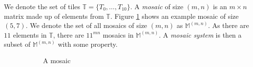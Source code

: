 \documentclass[12pt]{article}
\theoremstyle{plain}
\theoremstyle{definition}
\theoremstyle{remark}
\theoremstyle{definition}
\newcommand{\cell}[4]{ \draw[thick] ( #1 , #2 ) rectangle ( #3 , #4 );}
\newcommand{\cellA}[4]{\draw[red, thick, densely dotted] ( #1 + 0.5 , #2 ) arc(0:90:{0.5}); \draw[thick] ( #1 , #2 ) rectangle ( #3 , #4 );}
\newcommand{\cellB}[4]{\draw[red, thick, densely dotted] ( #1 + 1 , #2 + 0.5 ) arc(90:180:{0.5}); \draw[thick] ( #1 , #2 ) rectangle ( #3 , #4 );}
\newcommand{\cellC}[4]{\draw[red, thick, densely dotted] ( #1 + 0.5, #2 + 1 ) arc(180:270:{0.5}); \draw[thick] ( #1 , #2 ) rectangle ( #3 , #4 );}
\newcommand{\cellD}[4]{\draw[red, thick, densely dotted] ( #1 , #2 + 0.5 ) arc(-90:0:{0.5}); \draw[thick] ( #1 , #2 ) rectangle ( #3 , #4 );}
\newcommand{\cellE}[4]{\draw[red, thick, densely dotted] (#3, #4 * 0.5 + #2 * 0.5) -- (#1, #4 * 0.5 + #2 * 0.5); \draw[thick] ( #1 , #2 ) rectangle ( #3 , #4 );}
\newcommand{\cellF}[4]{\draw[red, thick, densely dotted] (#3 * 0.5 + #1 * 0.5 , #2) -- (#3 * 0.5 + #1 * 0.5 , #4); \draw[thick] ( #1 , #2 ) rectangle ( #3 , #4 );}
\newcommand{\cellG}[4]{\draw[red, thick, densely dotted] ( #1 + 0.5 , #2 ) arc(0:90:{0.5}); \draw[red, thick, densely dotted] ( #1 + 0.5, #2 + 1 ) arc(180:270:{0.5}); \draw[thick] ( #1 , #2 ) rectangle ( #3 , #4 );}
\newcommand{\cellH}[4]{\draw[red, thick, densely dotted] ( #1 , #2 + 0.5 ) arc(-90:0:{0.5}); \draw[red, thick, densely dotted] ( #1 + 1 , #2 + 0.5 ) arc(90:180:{0.5}); \draw[thick] ( #1 , #2 ) rectangle ( #3 , #4 );}
\newcommand{\cellI}[4]{\draw[red, thick, densely dotted] (#3 * 0.5 + #1 * 0.5 , #2) -- (#3 * 0.5 + #1 * 0.5 , #4); \node[shape=circle,draw=none,fill=white, inner sep=3pt,minimum size=5pt] (A) at ( #1 + 0.5 , #2 + 0.5 ) {}; \draw[red, thick, densely dotted] (#3, #4 * 0.5 + #2 * 0.5) -- (#1, #4 * 0.5 + #2 * 0.5); \draw[thick] ( #1 , #2 ) rectangle ( #3 , #4 );}
\newcommand{\cellJ}[4]{\draw[red, thick, densely dotted] (#3, #4 * 0.5 + #2 * 0.5) -- (#1, #4 * 0.5 + #2 * 0.5); \node[shape=circle,draw=none,fill=white, inner sep=3pt,minimum size=5pt] (A) at ( #1 + 0.5 , #2 + 0.5 ) {}; \draw[thick] ( #1 , #2 ) rectangle ( #3 , #4 ); \draw[red, thick, densely dotted] (#3 * 0.5 + #1 * 0.5 , #2) -- (#3 * 0.5 + #1 * 0.5 , #4);}
\newcommand{\cellAf}[4]{\filldraw[gray!40] ( #1 , #2 ) rectangle ( #3 , #4 ); \draw[red, thick, densely dotted] ( #1 + 0.5 , #2 ) arc(0:90:{0.5}); \draw[thick] ( #1 , #2 ) rectangle ( #3 , #4 );}
\newcommand{\cellBf}[4]{\filldraw[gray!40] ( #1 , #2 ) rectangle ( #3 , #4 ); \draw[red, thick, densely dotted] ( #1 + 1 , #2 + 0.5 ) arc(90:180:{0.5}); \draw[thick] ( #1 , #2 ) rectangle ( #3 , #4 );}
\newcommand{\cellCf}[4]{\filldraw[gray!40] ( #1 , #2 ) rectangle ( #3 , #4 ); \draw[red, thick, densely dotted] ( #1 + 0.5, #2 + 1 ) arc(180:270:{0.5}); \draw[thick] ( #1 , #2 ) rectangle ( #3 , #4 );}
\newcommand{\cellDf}[4]{\filldraw[gray!40] ( #1 , #2 ) rectangle ( #3 , #4 ); \draw[red, thick, densely dotted] ( #1 , #2 + 0.5 ) arc(-90:0:{0.5}); \draw[thick] ( #1 , #2 ) rectangle ( #3 , #4 );}
\newcommand{\cellEf}[4]{\filldraw[gray!40] ( #1 , #2 ) rectangle ( #3 , #4 ); \draw[red, thick, densely dotted] (#3, #4 * 0.5 + #2 * 0.5) -- (#1, #4 * 0.5 + #2 * 0.5); \draw[thick] ( #1 , #2 ) rectangle ( #3 , #4 );}
\newcommand{\cellFf}[4]{\filldraw[gray!40] ( #1 , #2 ) rectangle ( #3 , #4 ); \draw[red, thick, densely dotted] (#3 * 0.5 + #1 * 0.5 , #2) -- (#3 * 0.5 + #1 * 0.5 , #4); \draw[thick] ( #1 , #2 ) rectangle ( #3 , #4 );}
\newcommand{\cellIf}[4]{\filldraw[gray!40] ( #1 , #2 ) rectangle ( #3 , #4 ); \draw[red, thick, densely dotted] (#3 * 0.5 + #1 * 0.5 , #2) -- (#3 * 0.5 + #1 * 0.5 , #4); \node[shape=circle,draw=none,fill=gray!40, inner sep=3pt,minimum size=5pt] (A) at ( #1 + 0.5 , #2 + 0.5 ) {}; \draw[red, thick, densely dotted] (#3, #4 * 0.5 + #2 * 0.5) -- (#1, #4 * 0.5 + #2 * 0.5); \draw[thick] ( #1 , #2 ) rectangle ( #3 , #4 );}
\begin{document}
We denote the set of tiles $\mathbb{T}=\{T_0, \dots, T_{10}\}$. A \textit{mosaic} of size $(m,n)$ is an $m \times n$ matrix made up of elements from $\mathbb{T}$. Figure \ref{fig:example mosaic} shows an example mosaic of size $(5,7)$. We denote the set of all mosaics of size $(m,n)$ as $\mathbb{M}^{(m,n)}$. As there are $11$ elements in $\mathbb{T}$, there are $11^{mn}$ mosaics in $\mathbb{M}^{(m,n)}$. A \textit{mosaic system} is then a subset of $\mathbb{M}^{(m,n)}$ with some property. 

\begin{figure}[h!]
    \begin{center}
    \begin{subfigure}{0.4\textwidth}
    \caption{A mosaic}
    \label{fig:example mosaic}
    \end{subfigure}
\hspace{0.05\textwidth}
\begin{subfigure}{0.4\textwidth}
\end{subfigure}
\end{center}
\end{figure}
\end{document}
